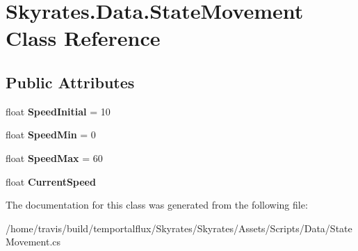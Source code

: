 \hypertarget{class_skyrates_1_1_data_1_1_state_movement}{\section{Skyrates.\-Data.\-State\-Movement Class Reference}
\label{class_skyrates_1_1_data_1_1_state_movement}
}
\subsection*{Public Attributes}
\begin{DoxyCompactItemize}
\item 
\hypertarget{class_skyrates_1_1_data_1_1_state_movement_a176174570d09296069fe6834c153172b}{float {\bfseries Speed\-Initial} = 10}\label{class_skyrates_1_1_data_1_1_state_movement_a176174570d09296069fe6834c153172b}

\item 
\hypertarget{class_skyrates_1_1_data_1_1_state_movement_a3fc252333cea8c344cdad5ff0477e915}{float {\bfseries Speed\-Min} = 0}\label{class_skyrates_1_1_data_1_1_state_movement_a3fc252333cea8c344cdad5ff0477e915}

\item 
\hypertarget{class_skyrates_1_1_data_1_1_state_movement_a3993d09c0eeed99d04bfd2c64876c486}{float {\bfseries Speed\-Max} = 60}\label{class_skyrates_1_1_data_1_1_state_movement_a3993d09c0eeed99d04bfd2c64876c486}

\item 
\hypertarget{class_skyrates_1_1_data_1_1_state_movement_a03fdc8f2951c6ebb4b1debf368e9f1b0}{float {\bfseries Current\-Speed}}\label{class_skyrates_1_1_data_1_1_state_movement_a03fdc8f2951c6ebb4b1debf368e9f1b0}

\end{DoxyCompactItemize}


The documentation for this class was generated from the following file\-:\begin{DoxyCompactItemize}
\item 
/home/travis/build/temportalflux/\-Skyrates/\-Skyrates/\-Assets/\-Scripts/\-Data/State\-Movement.\-cs\end{DoxyCompactItemize}
